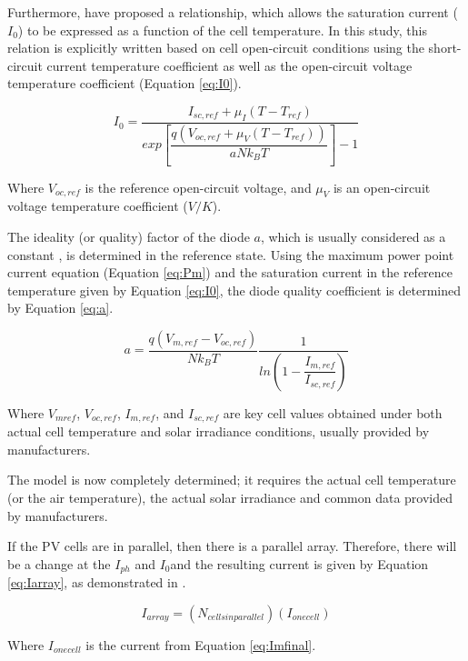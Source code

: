 Furthermore, \cite{Villalva} have proposed a relationship, which allows the saturation current ($ I_{0} $) to be expressed as a function of the cell temperature. In this study, this relation is explicitly written based on cell open-circuit conditions using the short-circuit current temperature coefficient as well as the open-circuit voltage temperature coefficient (Equation \ref{eq:I0}).

\begin{equation}
\label{eq:I0}
I_{0} = \dfrac{I_{sc,ref} + \mu_{I}(T - T_{ref})}{exp \left[ \dfrac{q(V_{oc,ref} + \mu_{V} (T - T_{ref}))}{aNk_{B}T}    \right] -1}
\end{equation}

Where $ V_{oc,ref} $ is the reference open-circuit voltage, and $ \mu_{V} $ is an open-circuit voltage temperature coefficient ($ V/K $).

The ideality (or quality) factor of the diode $ a $, which is usually considered as a constant \cite{Villalva}, is determined in the reference state. Using the maximum power point current equation (Equation \ref{eq:Pm}) and the saturation current in the reference temperature given by Equation \ref{eq:I0}, the diode quality coefficient is determined by Equation \ref{eq:a}.

\begin{equation}
\label{eq:a}
a = \dfrac{q(V_{m,ref}-V_{oc,ref})}{Nk_{B}T} \dfrac{1}{ln \left( 1 - \dfrac{I_{m,ref}}{I_{sc,ref}}  \right) }
\end{equation}

Where $ V_{mref} $, $ V_{oc,ref} $, $ I_{m,ref} $, and $ I_{sc,ref} $ are key cell values obtained under both actual cell temperature and solar irradiance conditions, usually provided by manufacturers.

The model is now completely determined; it requires the actual cell temperature (or the air temperature), the actual solar irradiance and common data provided by manufacturers.

If the PV cells are in parallel, then there is a parallel array. Therefore, there will be a change at the $ I_{ph} $ and $ I_{0} $and the resulting current is given by Equation \ref{eq:Iarray}, as demonstrated in \cite{Saloux}.

\begin{equation}
\label{eq:Iarray}
I_{array} = (N_{cells in parallel})(I_{one cell})
\end{equation}

Where $ I_{one cell} $ is the current from Equation \ref{eq:Imfinal}.

